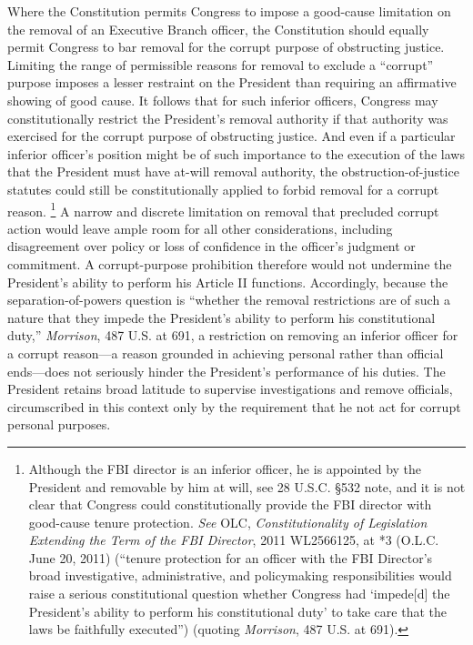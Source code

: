 Where the Constitution permits Congress to impose a good-cause limitation on the removal of an Executive Branch officer, the Constitution should equally permit Congress to bar removal for the corrupt purpose of obstructing justice.
Limiting the range of permissible reasons for removal to exclude a “corrupt” purpose imposes a lesser restraint on the President than requiring an affirmative showing of good cause.
It follows that for such inferior officers, Congress may constitutionally restrict the President’s removal authority if that authority was exercised for the corrupt purpose of obstructing justice.
And even if a particular inferior officer’s position might be of such importance to the execution of the laws that the President must have at-will removal authority, the obstruction-of-justice statutes could still be constitutionally applied to forbid removal for a corrupt reason.%
\footnote{Although the FBI director is an inferior officer, he is appointed by the President and removable by him at will, see 28 U.S.C. \S 532 note, and it is not clear that Congress could constitutionally provide the FBI director with good-cause tenure protection.
\textit{See} OLC, \textit{Constitutionality of Legislation Extending the Term of the FBI Director}, 2011 WL2566125, at *3 (O.L.C. June 20, 2011) (“tenure protection for an officer with the FBI Director’s broad investigative, administrative, and policymaking responsibilities would raise a serious constitutional question whether Congress had ‘impede[d] the President’s ability to perform his constitutional duty’ to take care that the laws be faithfully executed”) (quoting \textit{Morrison}, 487 U.S. at 691).}
A narrow and discrete limitation on removal that precluded corrupt action would leave ample room for all other considerations, including disagreement over policy or loss of confidence in the officer’s judgment or commitment.
A corrupt-purpose prohibition therefore would not undermine the President’s ability to perform his Article II functions.
Accordingly, because the separation-of-powers question is “whether the removal restrictions are of such a nature that they impede the President’s ability to perform his constitutional duty,” \textit{Morrison}, 487 U.S. at 691, a restriction on removing an inferior officer for a corrupt reason---a reason grounded in achieving personal rather than official ends---does not seriously hinder the President’s performance of his duties.
The President retains broad latitude to supervise investigations and remove officials, circumscribed in this context only by the requirement that he not act for corrupt personal purposes.%
